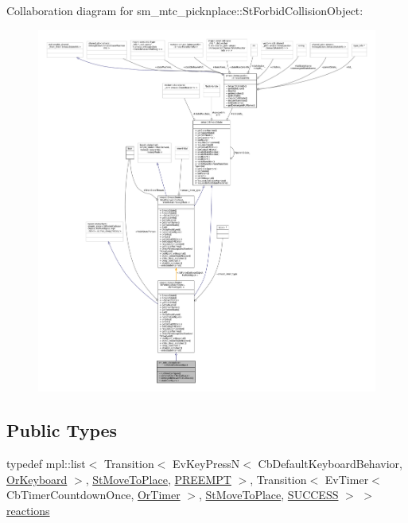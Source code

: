 Collaboration diagram for sm\+\_\+mtc\+\_\+picknplace\+:\+:St\+Forbid\+Collision\+Object\+:
\nopagebreak
\begin{figure}[H]
\begin{center}
\leavevmode
\includegraphics[width=350pt]{structsm__mtc__picknplace_1_1StForbidCollisionObject__coll__graph}
\end{center}
\end{figure}
\subsection*{Public Types}
\begin{DoxyCompactItemize}
\item 
typedef mpl\+::list$<$ Transition$<$ Ev\+Key\+PressN$<$ Cb\+Default\+Keyboard\+Behavior, \hyperlink{classsm__mtc__picknplace_1_1OrKeyboard}{Or\+Keyboard} $>$, \hyperlink{structsm__mtc__picknplace_1_1StMoveToPlace}{St\+Move\+To\+Place}, \hyperlink{classPREEMPT}{P\+R\+E\+E\+M\+PT} $>$, Transition$<$ Ev\+Timer$<$ Cb\+Timer\+Countdown\+Once, \hyperlink{classsm__mtc__picknplace_1_1OrTimer}{Or\+Timer} $>$, \hyperlink{structsm__mtc__picknplace_1_1StMoveToPlace}{St\+Move\+To\+Place}, \hyperlink{classSUCCESS}{S\+U\+C\+C\+E\+SS} $>$ $>$ \hyperlink{structsm__mtc__picknplace_1_1StForbidCollisionObject_a3b8acccc4fc5725d6455b9e397012a41}{reactions}
\end{DoxyCompactItemize}
